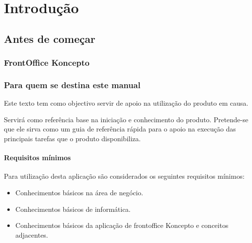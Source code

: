 \documentclass[a4paper,11pt,openany]{memoir}
\begin{document}
\tableofcontents

\newpage
\part{Introdução}

\chapter{Antes de começar}

\section{FrontOffice Koncepto}     %
%

\section{Para quem se destina este manual}

Este texto tem como objectivo servir de apoio na utilização do produto em causa.

Servirá como referência base na iniciação e conhecimento do produto. Pretende-se
que ele sirva como um guia de referência rápida para o apoio na execução das
principais tarefas que o produto disponibiliza.



\subsection{Requisitos mínimos}

Para utilização desta aplicação são considerados os seguintes requisitos mínimos:
\begin{itemize}
\item Conhecimentos básicos na área de negócio.
\item Conhecimentos básicos de informática.
\item Conhecimentos básicos da aplicação de frontoffice Koncepto e conceitos adjacentes.
\end{itemize}


\end{document}
